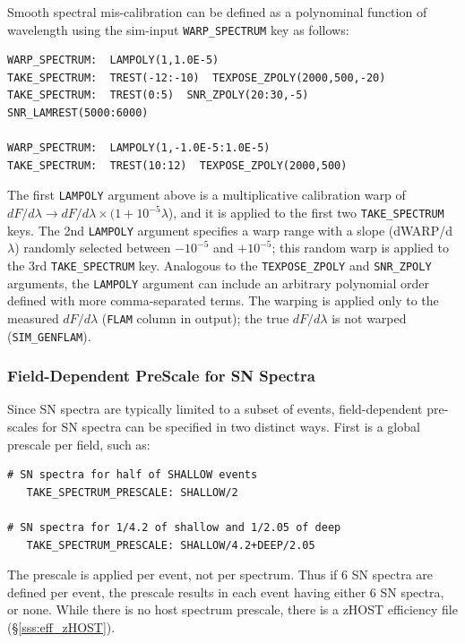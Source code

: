 \documentclass[12pt]{article}
\newcommand{\Flam}{dF/d\lambda}
\begin{document}
Smooth spectral mis-calibration can be defined as a polynominal
function of wavelength using the sim-input 
{\tt WARP\_SPECTRUM} key as follows:
%
\begin{Verbatim}[frame=single]
WARP_SPECTRUM:  LAMPOLY(1,1.0E-5)
TAKE_SPECTRUM:  TREST(-12:-10)  TEXPOSE_ZPOLY(2000,500,-20)
TAKE_SPECTRUM:  TREST(0:5)  SNR_ZPOLY(20:30,-5)  SNR_LAMREST(5000:6000)

WARP_SPECTRUM:  LAMPOLY(1,-1.0E-5:1.0E-5)
TAKE_SPECTRUM:  TREST(10:12)  TEXPOSE_ZPOLY(2000,500)
\end{Verbatim}
%
The first {\tt LAMPOLY} argument above is a multiplicative
calibration warp of $\Flam \to \Flam \times (1+10^{-5}\lambda$), 
and it is applied to the first two {\tt TAKE\_SPECTRUM} keys.
The 2nd {\tt LAMPOLY} argument specifies a warp range with a slope 
(dWARP/d$\lambda$) randomly selected between $-10^{-5}$ and $+10^{-5}$;
this random warp is applied to the 3rd {\tt TAKE\_SPECTRUM} key.
Analogous to the {\tt TEXPOSE\_ZPOLY} and {\tt SNR\_ZPOLY} arguments,
the {\tt LAMPOLY} argument can include an arbitrary polynomial order 
defined with more comma-separated terms. 
The warping is applied only to the measured $\Flam$ 
({\tt FLAM} column in output); 
the true $\Flam$ is not warped ({\tt SIM\_GENFLAM}).

\clearpage
\subsubsection{Field-Dependent PreScale for SN Spectra}
\label{sss:SPEC_PRESCALE}

Since SN spectra are typically limited to a subset of events,
field-dependent pre-scales for SN spectra can be specified in 
two distinct ways. First is a global prescale per field, such as:
%
\begin{verbatim}
# SN spectra for half of SHALLOW events
   TAKE_SPECTRUM_PRESCALE: SHALLOW/2  

# SN spectra for 1/4.2 of shallow and 1/2.05 of deep
   TAKE_SPECTRUM_PRESCALE: SHALLOW/4.2+DEEP/2.05
\end{verbatim}
The prescale is applied per event, not per spectrum.
Thus if 6 SN spectra are defined per event, the prescale
results in each event having either 6 SN spectra, or none.
While there is no host spectrum prescale,
there is a zHOST efficiency file (\S\ref{sss:eff_zHOST}).
\end{document}
